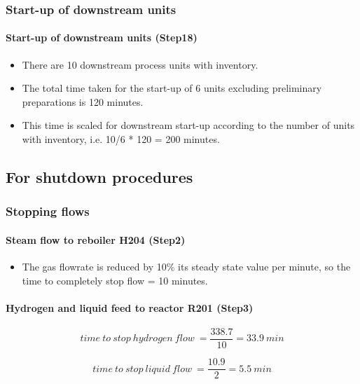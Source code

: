 \subsubsection{Start-up of downstream units }
\paragraph{Start-up of downstream units (Step18)}
    \begin{itemize}
        \item There are 10 downstream process units with inventory.
        \item The total time taken for the start-up of 6 units excluding preliminary preparations is 120 minutes.
        \item This time is scaled for downstream start-up according to the number of units with inventory, i.e. 10/6 * 120 = 200 minutes.
    \end{itemize}

\subsection{For shutdown procedures}

\subsubsection{Stopping flows}
\paragraph{Steam flow to reboiler H204 (Step2)}   
    \begin{itemize}
        \item The gas flowrate is reduced by 10\% its steady state value per minute, so the time to completely stop flow = 10 minutes.
    \end{itemize}
    
\paragraph{Hydrogen and liquid feed to reactor R201 (Step3)}
    \begin{equation}
        time\:to\:stop\:hydrogen\:flow\:=\frac{338.7}{10}=33.9\:min
    \end{equation}
    
    \begin{equation}
        time\:to\:stop\:liquid\:flow\:=\frac{10.9}{2}=5.5\:min
    \end{equation}
    
